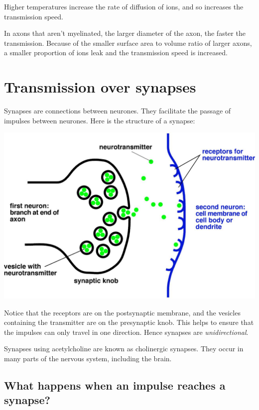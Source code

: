 \documentclass{article}
\begin{document}
Higher temperatures increase the rate of diffusion of ions, and so increases the
transmission speed.

In axons that aren't myelinated, the larger diameter of the axon, the faster the
transmission. Because of the smaller surface area to volume ratio of larger
axons, a smaller proportion of ions leak and the transmission speed is
increased.

\newpage

\section*{Transmission over synapses}

Synapses are connections between neurones. They facilitate the passage of
impulses between neurones. Here is the structure of a synapse:

\begin{center}
	\includegraphics[scale=0.6]{synapse2}
\end{center}

Notice that the receptors are on the postsynaptic membrane, and the vesicles
containing the transmitter are on the presynaptic knob. This helps to ensure
that the impulses can only travel in one direction. Hence synapses are {\it
unidirectional}.

Synapses using acetylcholine are known as cholinergic synapses. They occur in
many parts of the nervous system, including the brain.

\subsection*{What happens when an impulse reaches a synapse?}
\end{document}
